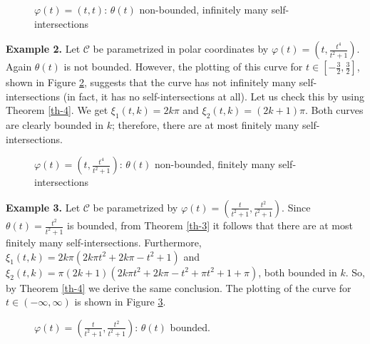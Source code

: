 \documentclass{elsart}
\begin{document}
\begin{figure}[ht]
\begin{center}
\centerline{  }
\end{center}
\caption{$\varphi(t)=(t,t)$: $\theta(t)$ non-bounded, infinitely many self-intersections}\label{ej1}
\end{figure}


{\bf Example 2.} Let ${\mathcal C}$ be parametrized in polar coordinates by $\varphi(t)=\left(t,\displaystyle{\frac{t^4}{t^2+1}}\right)$. Again
$\theta(t)$ is not bounded. However, the plotting of this curve for $t\in \left[\displaystyle{-\frac{3}{2},\frac{3}{2}}\right]$, shown in Figure
\ref{ej2}, suggests that the curve has not infinitely many self-intersections (in fact, it has no self-intersections at all). Let us check this by using
Theorem \ref{th-4}. We get
$\xi_1(t,k)=2k\pi$ and $\xi_2(t,k)=(2k+1)\pi$. Both curves are clearly bounded in $k$; therefore, there are at most finitely many
self-intersections.

\begin{figure}[ht]
\begin{center}
\centerline{  }
\end{center}
\caption{$\varphi(t)=\left(t,\displaystyle{\frac{t^4}{t^2+1}}\right)$: $\theta(t)$ non-bounded, finitely many self-intersections}\label{ej2}
\end{figure}

{\bf Example 3.} Let ${\mathcal C}$ be parametrized by $\varphi(t)=\left(\displaystyle{\frac{t}{t^2+1},\frac{t^2}{t^2+1}}\right)$. Since
$\theta(t)=\displaystyle{\frac{t^2}{t^2+1}}$ is bounded, from Theorem \ref{th-3} it follows that there are at most finitely many
self-intersections. Furthermore,  $\xi_1(t,k)=2k\pi(2k \pi t^2+2k\pi-t^2+1)$ and
$\xi_2(t,k)=\pi(2k+1)(2k\pi t^2+2k \pi-t^2+\pi t^2+1+\pi)$, both bounded in $k$. So, by Theorem \ref{th-4} we derive the same
conclusion. The plotting of the curve for $t\in (-\infty,\infty)$ is shown in Figure \ref{ej3}.

\begin{figure}[ht]
\begin{center}
\centerline{  }
\end{center}
\caption{$\varphi(t)=\left(\displaystyle{\frac{t}{t^2+1},\frac{t^2}{t^2+1}}\right)$: $\theta(t)$ bounded.}\label{ej3}
\end{figure}
\end{document}

